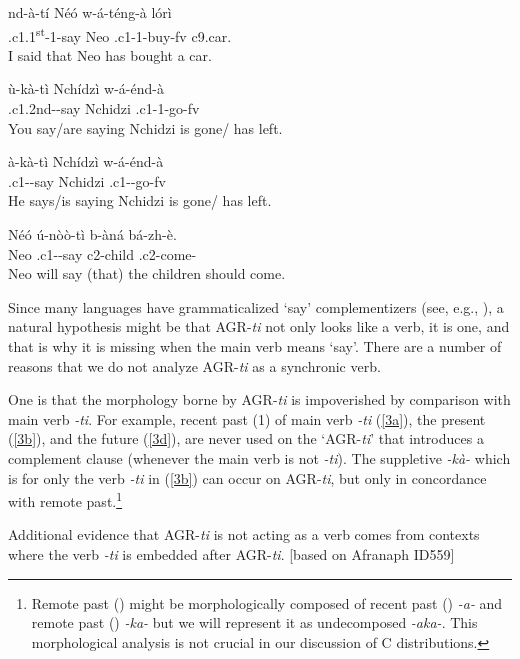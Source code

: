 \documentclass[output=paper,
modfonts
]{langscibook}
\begin{document}
\ea \label{3}
\ea\label{3a} \gll nd-à-tí Néó w-á-téng-à	lórì \\
	.c1.1\textsuperscript{st}-1-say	Neo	.c1-1-buy-fv		c9.car.\\ 
	\glt I said that Neo has bought a car.

\ex\label{3b}  \gll	ù-kà-tì			Nchídzì	w-á-énd-à \\
     	.c1.2nd--say	Nchidzi	.c1-1-go-fv \\
	\glt You say/are saying  Nchidzi is gone/ has left.

\ex\label{3c}    \gll à-kà-tì			Nchídzì	w-á-énd-à \\
      	.c1--say	Nchidzi	.c1--go-fv \\
     	\glt He says/is saying Nchidzi is gone/ has left. 

\ex\label{3d}  \gll Néó	ú-nòò-tì		b-àná		bá-zh-è.\\
	Neo	.c1--say	c2-child	.c2-come-\\
	\glt Neo will say (that) the children should come.

\z
\z 

Since many languages have grammaticalized `say' complementizers (see, e.g., \citealt{Heine2002}), a natural hypothesis might be that AGR-\textit{ti} not only looks like a verb, it is one, and that is why it is missing when the main verb means `say'. There are a number of reasons that we do not analyze AGR-\textit{ti} as a synchronic verb. 

One is that the morphology borne by AGR-\textit{ti} is impoverished by comparison with main verb \textit{-ti}. For example,  recent past (1) of main verb \textit{-ti} (\ref{3a}), the present (\ref{3b}), and the future (\ref{3d}),  are never used on the ‘AGR-\textit{ti}’ that introduces a complement clause (whenever the main verb is not \textit{-ti}). The suppletive \textit{-kà-} which is  for only the verb \textit{-ti} in (\ref{3b})   can occur on AGR-\textit{ti}, but only in concordance with remote past.\footnote{Remote past () might be morphologically composed of recent past () \textit{-a-} and remote past () \textit{-ka-} but we will represent it as undecomposed \textit{-aka-}. This morphological analysis is not crucial in our discussion of C distributions.}  

Additional evidence that AGR-\textit{ti} is not acting as a verb comes from contexts where the verb \textit{-ti} is embedded after AGR-\textit{ti}. [based on Afranaph ID559]
\end{document}
